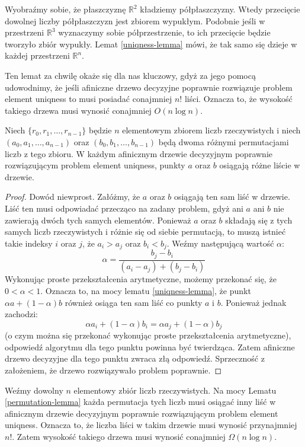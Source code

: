 Wyobraźmy sobie, że płaszczyznę $\mathbb{R}^2$ kładziemy półpłaszczyzny.
Wtedy przecięcie dowolnej liczby półpłaszczyzn jest zbiorem wypukłym.
Podobnie jeśli w przestrzeni $\mathbb{R}^3$ wyznaczymy sobie półprzestrzenie, to ich przecięcie będzie tworzyło zbiór wypukły.
Lemat \ref{uniqness-lemma} mówi, że tak samo się dzieje w każdej przestrzeni $\mathbb{R}^n$.

Ten lemat za chwilę okaże się dla nas kluczowy, gdyż za jego pomocą udowodnimy, że jeśli afiniczne drzewo decyzyjne poprawnie rozwiązuje problem element uniqness to musi posiadać conajmniej $n!$ liści.
Oznacza to, że wysokość takiego drzewa musi wynosić conajmniej $O(n \log n)$.

\begin{lemma}
 \label{permutation-lemma}
 Niech $\{r_0, r_1, \ldots, r_{n-1}\}$ będzie $n$ elementowym zbiorem liczb rzeczywistych i niech $(a_0, a_1, \ldots, a_{n-1})$ oraz $(b_0, b_1, \ldots, b_{n-1})$ będą dwoma różnymi permutacjami liczb z tego zbioru.
 W każdym afinicznym drzewie decyzyjnym poprawnie rozwiązującym problem element uniqness, punkty $a$ oraz $b$ osiągają różne liście w drzewie.
\end{lemma}

\begin{proof}
 Dowód niewprost.
 Załóżmy, że $a$ oraz $b$ osiągają ten sam liść w drzewie.
 Liść ten musi odpowiadać przecząco na zadany problem, gdyż ani $a$ ani $b$ nie zawierają dwóch tych samych elementów.
 Ponieważ $a$ oraz $b$ składają się z tych samych liczb rzeczywistych i różnie się od siebie permutacją, to muszą istnieć takie indeksy $i$ oraz $j$, że $a_i > a_j$ oraz $b_i < b_j$.
 Weźmy następującą wartość $\alpha$:
 \[
  \alpha = \frac{b_j - b_i}{(a_i - a_j) + (b_j - b_i)}
 \]
 Wykonując proste przekształcenia arytmetyczne, możemy przekonać się, że $0 < \alpha < 1$.
 Oznacza to, na mocy lematu \ref{uniqness-lemma}, że punkt $\alpha a + (1 - \alpha)b$ również osiąga ten sam liść co punkty $a$ i $b$.
 Ponieważ jednak zachodzi:
 \[
  \alpha a_i + (1 - \alpha) b_i = \alpha a_j + (1 - \alpha) b_j
 \]
 (o czym można się przekonać wykonując proste przekształcenia arytmetyczne), odpowiedź algorytmu dla tego punktu powinna być twierdząca.
 Zatem afiniczne drzewo decyzyjne dla tego punktu zwraca złą odpowiedź.
 Sprzeczność z założeniem, że drzewo rozwiązywało problem poprawnie.
\end{proof}

Weźmy dowolny $n$ elementowy zbiór liczb rzeczywistych.
Na mocy Lematu \ref{permutation-lemma} każda permutacja tych liczb musi osiągać inny liść w afinicznym drzewie decyzyjnym poprawnie rozwiązującym problem element uniqness.
Oznacza to, że liczba liści w takim drzewie musi wynosić przynajmniej $n!$.
Zatem wysokość takiego drzewa musi wynosić conajmniej $\Omega(n \log n)$.